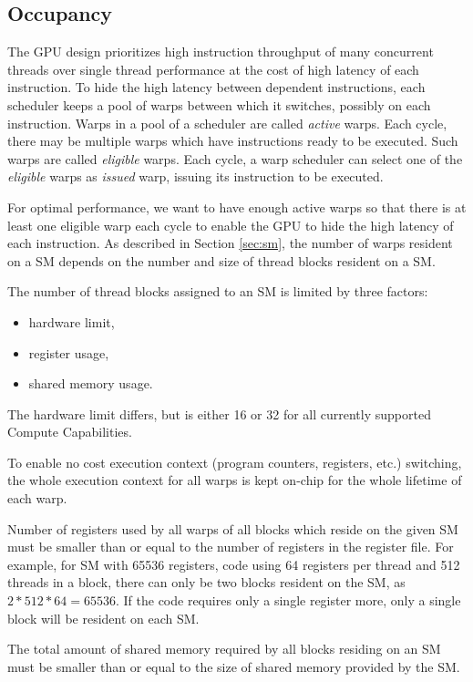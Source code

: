\subsection{Occupancy}

The GPU design prioritizes high instruction throughput of many concurrent threads over single thread performance at the cost of high latency of each instruction. To hide the high latency between dependent instructions, each scheduler keeps a pool of warps between which it switches, possibly on each instruction. Warps in a pool of a scheduler are called \textit{active} warps.
Each cycle, there may be multiple warps which have instructions ready to be executed. Such warps are called \textit{eligible} warps.
Each cycle, a warp scheduler can select one of the \textit{eligible} warps as \textit{issued} warp, issuing its instruction to be executed.

For optimal performance, we want to have enough active warps so that there is at least one eligible warp each cycle to enable the GPU to hide the high latency of each instruction. As described in Section \ref{sec:sm}, the number of warps resident on a SM depends on the number and size of thread blocks resident on a SM.

The number of thread blocks assigned to an SM is limited by three factors:

\begin{itemize}
	\item hardware limit,
	\item register usage,
	\item shared memory usage.
\end{itemize}

The hardware limit differs, but is either 16 or 32 for all currently supported Compute Capabilities. 

To enable no cost execution context (program counters, registers, etc.) switching, the whole execution context for all warps is kept on-chip for the whole lifetime of each warp. 


Number of registers used by all warps of all blocks which reside on the given SM must be smaller than or equal to the number of registers in the register file. For example, for SM with 65536 registers, code using 64 registers per thread and 512 threads in a block, there can only be two blocks resident on the SM, as $2*512*64 = 65536$. If the code requires only a single register more, only a single block will be resident on each SM.

The total amount of shared memory required by all blocks residing on an SM must be smaller than or equal to the size of shared memory provided by the SM. 

